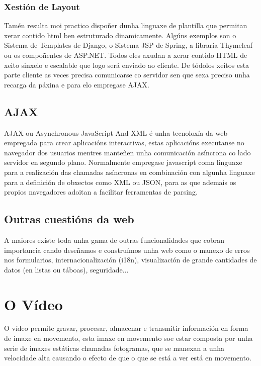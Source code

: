         \subsubsection{Xestión de Layout}
            Tamén resulta moi practico dispoñer dunha linguaxe de plantilla que permitan xerar contido
            html ben estruturado dinamicamente. Algúns exemplos son o Sistema de Templates de Django, o 
            Sistema JSP de Spring, a libraría Thymeleaf ou os compoñentes de ASP.NET. Todos eles axudan 
            a xerar contido HTML de xeito sinxelo e escalable que logo será enviado ao cliente. De
            tódolos xeitos esta parte cliente as veces precisa comunicarse co servidor sen que sexa 
            preciso unha recarga da páxina e para elo empregase AJAX.
		
    \subsection{AJAX}
		AJAX ou Asynchronous JavaScript And XML é unha tecnoloxía da web empregada para crear 
		aplicacións interactivas, estas aplicacións executanse no navegador dos usuarios mentres 
		manteñen unha comunicación asíncrona co lado servidor en segundo plano. Normalmente 
		empregase javascript coma linguaxe para a realización das chamadas asíncronas en combinación
		con algunha linguaxe para a definición de obxectos como XML ou JSON, para as que ademais os
		propios navegadores adoitan a facilitar ferramentas de parsing.
		
	\subsection{Outras cuestións da web}
		A maiores existe toda unha gama de outras funcionalidades que cobran importancia cando deseñamos
		e construímos unha web como o manexo de erros nos formularios, internacionalización (i18n), 
		visualización de grande cantidades de datos (en listas ou táboas), seguridade...
		
		
\section{O Vídeo}
    O vídeo permite gravar, procesar, almacenar e transmitir información en forma de 
    imaxe en movemento, esta imaxe en movemento soe estar composta por unha serie de imaxes 
    estáticas chamadas fotogramas, que se manexan a unha velocidade alta causando o efecto de que o
    que se está a ver está en movemento.
    
